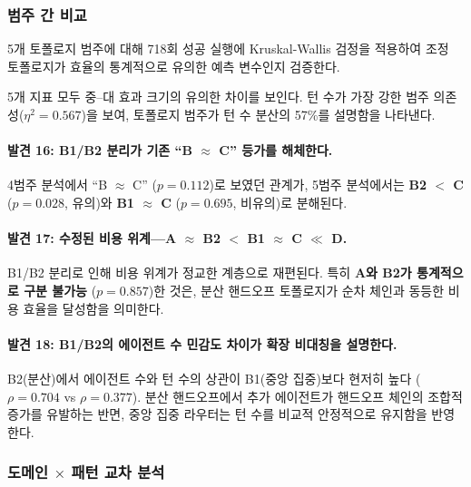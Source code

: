 \documentclass[a4paper,11pt]{article}
\begin{document}
\subsubsection{범주 간 비교}

5개 토폴로지 범주에 대해 718회 성공 실행에 Kruskal-Wallis 검정을 적용하여 조정 토폴로지가 효율의 통계적으로 유의한 예측 변수인지 검증한다.


5개 지표 모두 중--대 효과 크기의 유의한 차이를 보인다. 턴 수가 가장 강한 범주 의존성($\eta^{2}=0.567$)을 보여, 토폴로지 범주가 턴 수 분산의 57\%를 설명함을 나타낸다.



\paragraph{발견 16: B1/B2 분리가 기존 ``B $\approx$ C'' 등가를 해체한다.}
4범주 분석에서 ``B $\approx$ C'' ($p=0.112$)로 보였던 관계가, 5범주 분석에서는 \textbf{B2 $<$ C} ($p=0.028$, 유의)와 \textbf{B1 $\approx$ C} ($p=0.695$, 비유의)로 분해된다.

\paragraph{발견 17: 수정된 비용 위계---A $\approx$ B2 $<$ B1 $\approx$ C $\ll$ D.}
B1/B2 분리로 인해 비용 위계가 정교한 계층으로 재편된다. 특히 \textbf{A와 B2가 통계적으로 구분 불가능} ($p=0.857$)한 것은, 분산 핸드오프 토폴로지가 순차 체인과 동등한 비용 효율을 달성함을 의미한다.


\paragraph{발견 18: B1/B2의 에이전트 수 민감도 차이가 확장 비대칭을 설명한다.}
B2(분산)에서 에이전트 수와 턴 수의 상관이 B1(중앙 집중)보다 현저히 높다 ($\rho=0.704$ vs $\rho=0.377$). 분산 핸드오프에서 추가 에이전트가 핸드오프 체인의 조합적 증가를 유발하는 반면, 중앙 집중 라우터는 턴 수를 비교적 안정적으로 유지함을 반영한다.

\subsubsection{도메인 $\times$ 패턴 교차 분석}
\end{document}
